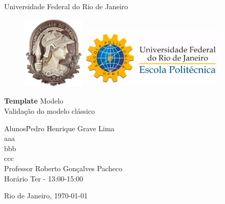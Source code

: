 \documentclass[a4paper, 12pt]{article}
\begin{document}

\begin{titlepage}
	\begin{center}
		\huge{Universidade Federal do Rio de Janeiro}

\vspace{10pt}
\begin{figure}[!ht]
\centering
\includegraphics[width=3cm]{minerva.eps}
\hspace{3cm}
\includegraphics[height=3cm, width=7cm]{poli-logo.pdf}
\end{figure}
        
        \vspace{85pt}
        
		\textbf{\LARGE{Template}}
		\large{Modelo\\
        		Validação do modelo clássico}
		\vspace{160pt}
		
	\end{center}
	
	\begin{flushleft}
		\begin{tabbing}
			Alunos\qquad\qquad\= Pedro Henrique Grave Lima\\
			\>aaa\\
            \> bbb\\
            \> ccc \\
			Professor\> Roberto Gonçalves Pacheco \\
			Horário\> Ter - 13:00-15:00\\
		
	\end{tabbing}
		  
	\end{flushleft}
	
	\begin{center}
		\vspace{\fill}
		Rio de Janeiro, \today
	\end{center}
\end{titlepage}
\newpage
\tableofcontents
\thispagestyle{empty}
\end{document}
